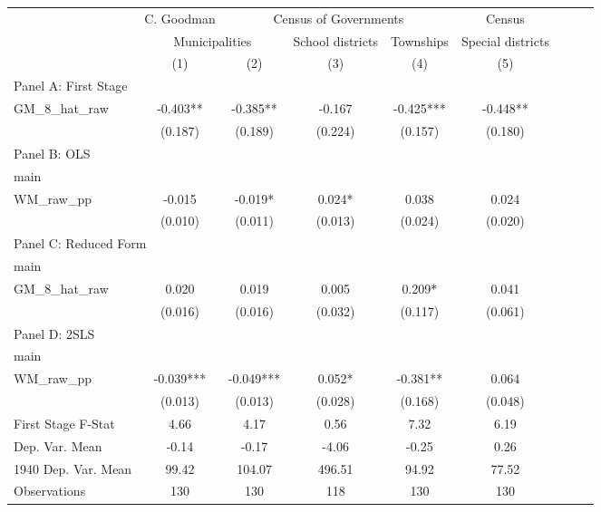  \begin{tabular}{l*{8}{c}} \toprule
&\multicolumn{1}{c}{C. Goodman}&\multicolumn{3}{c}{Census of Governments}&\multicolumn{1}{c}{Census}\\\cmidrule(lr){2-2}\cmidrule(lr){3-5}\cmidrule(lr){6-6}
&\multicolumn{2}{c}{Municipalities}&\multicolumn{1}{c}{School districts}&\multicolumn{1}{c}{Townships}&\multicolumn{1}{c}{Special districts}&\\\cmidrule(lr){2-3}\cmidrule(lr){4-5}\cmidrule(lr){6-6}
&\multicolumn{1}{c}{(1)}&\multicolumn{1}{c}{(2)}&\multicolumn{1}{c}{(3)}&\multicolumn{1}{c}{(4)}&\multicolumn{1}{c}{(5)}\\
\cmidrule(lr){1-6}
\multicolumn{5}{l}{Panel A: First Stage}\\
\cmidrule(lr){1-6}
GM\_8\_hat\_raw    &   -0.403** &   -0.385** &   -0.167   &   -0.425***&   -0.448** \\
                &  (0.187)   &  (0.189)   &  (0.224)   &  (0.157)   &  (0.180)   \\
\cmidrule(lr){1-6}
\multicolumn{5}{l}{Panel B: OLS}\\
\cmidrule(lr){1-6}
main            &            &            &            &            &            \\
WM\_raw\_pp       &   -0.015   &   -0.019*  &    0.024*  &    0.038   &    0.024   \\
                &  (0.010)   &  (0.011)   &  (0.013)   &  (0.024)   &  (0.020)   \\
\cmidrule(lr){1-6}
\multicolumn{5}{l}{Panel C: Reduced Form}\\
\cmidrule(lr){1-6}
main            &            &            &            &            &            \\
GM\_8\_hat\_raw    &    0.020   &    0.019   &    0.005   &    0.209*  &    0.041   \\
                &  (0.016)   &  (0.016)   &  (0.032)   &  (0.117)   &  (0.061)   \\
\cmidrule(lr){1-6}
\multicolumn{5}{l}{Panel D: 2SLS}\\
\cmidrule(lr){1-6}
main            &            &            &            &            &            \\
WM\_raw\_pp       &   -0.039***&   -0.049***&    0.052*  &   -0.381** &    0.064   \\
                &  (0.013)   &  (0.013)   &  (0.028)   &  (0.168)   &  (0.048)   \\
\midrule
First Stage F-Stat&     4.66   &     4.17   &     0.56   &     7.32   &     6.19   \\
Dep. Var. Mean  &    -0.14   &    -0.17   &    -4.06   &    -0.25   &     0.26   \\
1940 Dep. Var. Mean&    99.42   &   104.07   &   496.51   &    94.92   &    77.52   \\
Observations    &      130   &      130   &      118   &      130   &      130   \\
 \bottomrule \end{tabular}
